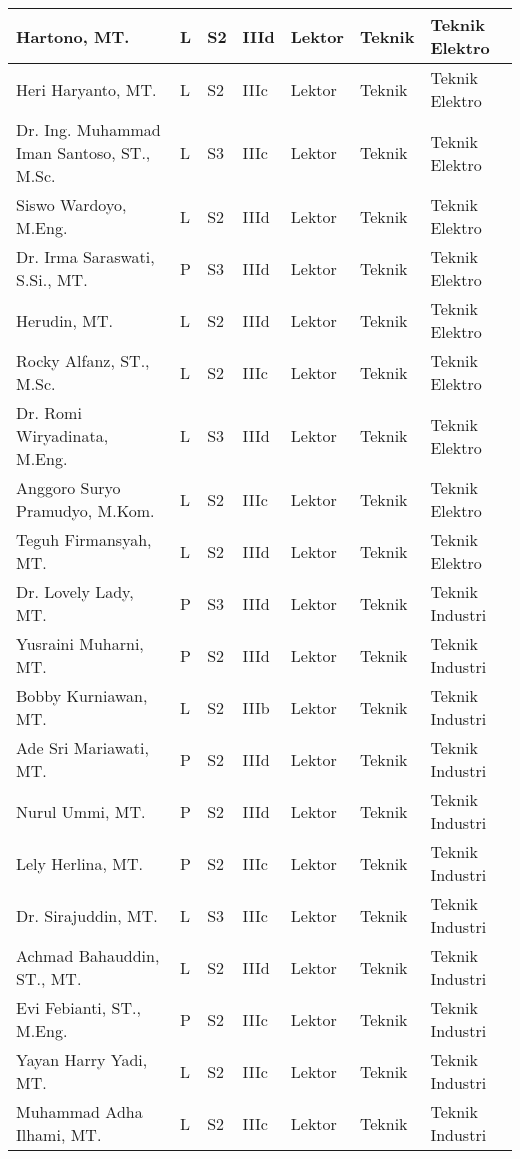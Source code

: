 \documentclass[
]{book}
\begin{document}
\begin{longtable}{l|l|l|l|l|l|l}
\hline
Hartono, MT. & L & S2 & IIId & Lektor & Teknik & Teknik Elektro\\
\hline
Heri Haryanto, MT. & L & S2 & IIIc & Lektor & Teknik & Teknik Elektro\\
\hline
Dr. Ing. Muhammad Iman Santoso, ST., M.Sc. & L & S3 & IIIc & Lektor & Teknik & Teknik Elektro\\
\hline
Siswo Wardoyo, M.Eng. & L & S2 & IIId & Lektor & Teknik & Teknik Elektro\\
\hline
Dr. Irma Saraswati, S.Si., MT. & P & S3 & IIId & Lektor & Teknik & Teknik Elektro\\
\hline
Herudin, MT. & L & S2 & IIId & Lektor & Teknik & Teknik Elektro\\
\hline
Rocky Alfanz, ST., M.Sc. & L & S2 & IIIc & Lektor & Teknik & Teknik Elektro\\
\hline
Dr. Romi Wiryadinata, M.Eng. & L & S3 & IIId & Lektor & Teknik & Teknik Elektro\\
\hline
Anggoro Suryo Pramudyo, M.Kom. & L & S2 & IIIc & Lektor & Teknik & Teknik Elektro\\
\hline
Teguh Firmansyah, MT. & L & S2 & IIId & Lektor & Teknik & Teknik Elektro\\
\hline
Dr. Lovely Lady, MT. & P & S3 & IIId & Lektor & Teknik & Teknik Industri\\
\hline
Yusraini Muharni, MT. & P & S2 & IIId & Lektor & Teknik & Teknik Industri\\
\hline
Bobby Kurniawan, MT. & L & S2 & IIIb & Lektor & Teknik & Teknik Industri\\
\hline
Ade Sri Mariawati, MT. & P & S2 & IIId & Lektor & Teknik & Teknik Industri\\
\hline
Nurul Ummi, MT. & P & S2 & IIId & Lektor & Teknik & Teknik Industri\\
\hline
Lely Herlina, MT. & P & S2 & IIIc & Lektor & Teknik & Teknik Industri\\
\hline
Dr. Sirajuddin, MT. & L & S3 & IIIc & Lektor & Teknik & Teknik Industri\\
\hline
Achmad Bahauddin,  ST., MT. & L & S2 & IIId & Lektor & Teknik & Teknik Industri\\
\hline
Evi Febianti, ST., M.Eng. & P & S2 & IIIc & Lektor & Teknik & Teknik Industri\\
\hline
Yayan Harry Yadi, MT. & L & S2 & IIIc & Lektor & Teknik & Teknik Industri\\
\hline
Muhammad Adha Ilhami, MT. & L & S2 & IIIc & Lektor & Teknik & Teknik Industri\\

\end{longtable}
\end{document}

